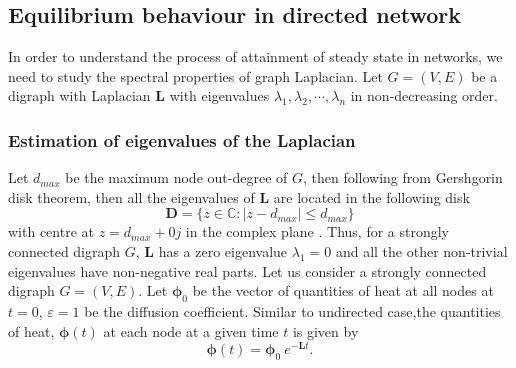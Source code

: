 \documentclass[10pt,a4paper]{article}
\theoremstyle{plain}
\theoremstyle{definition}
\begin{document}
        \subsection{Equilibrium behaviour in directed network}
        In order to understand the process of attainment of steady state in networks, we need to study the spectral properties of graph Laplacian. Let $G=(V,E)$ be a digraph with Laplacian $\mathbf{L}$ with eigenvalues $\lambda_1, \lambda_2, \cdots, \lambda_n$ in non-decreasing order. 
        \subsubsection{Estimation of eigenvalues of the Laplacian}
        Let $d_{max}$ be the maximum node out-degree of $G$, then following from Gershgorin disk theorem, then all the eigenvalues of $\mathbf{L}$ are located in the following disk
        \begin{equation} 
        \mathbf{D} = \{ z \in \mathbb{C} : |z-d_{max}| \leq d_{max} \}
        \end{equation}
        with centre at $z = d_{max} +0j$ in the complex plane \citep{saber2003agreement}. Thus, for a strongly connected digraph $G$, $\mathbf{L}$ has a zero eigenvalue $\lambda_1=0$ and all the other non-trivial eigenvalues have non-negative real parts.
        Let us consider a strongly connected digraph $G=(V,E)$. Let $\boldsymbol{\phi}_0$ be the vector of quantities of heat at all nodes at $t=0$, $\varepsilon=1$ be the diffusion coefficient. Similar to undirected case,the quantities of heat, $\boldsymbol{\phi}(t)$ at each node at a given time $t$ is given by
        \begin{equation}
        \boldsymbol{\phi}(t) = \boldsymbol{\phi}_0~e^{-\mathbf{L}t}.
        \end{equation}
        
\end{document}
